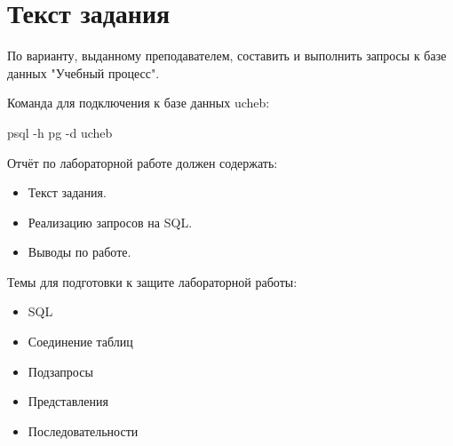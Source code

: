 \section {Текст задания}

По варианту, выданному преподавателем, составить и выполнить запросы к базе данных "Учебный процесс".

Команда для подключения к базе данных ucheb:

psql -h pg -d ucheb

Отчёт по лабораторной работе должен содержать:
\begin{itemize}
	\item Текст задания.
	\item Реализацию запросов на SQL.
	\item Выводы по работе.
\end{itemize}

Темы для подготовки к защите лабораторной работы:
\begin{itemize}
	\item SQL
	\item Соединение таблиц
	\item Подзапросы
	\item Представления
	\item Последовательности
\end{itemize}

